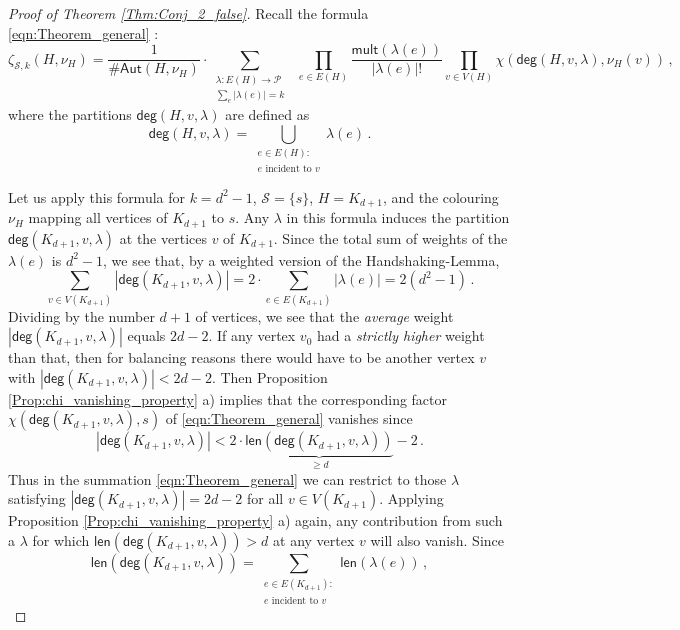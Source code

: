 \documentclass[authorcolumns,numberwithinsect]{no-lipics-v2022}
\begin{document}
\begin{proof}[Proof of Theorem \ref{Thm:Conj_2_false}]
Recall the formula \eqref{eqn:Theorem_general} :
\begin{equation} \zeta_{\mathcal{S},k}(H,\nu_H)=\frac{1}{\#\mathsf{Aut}(H, \nu_H)} \cdot \sum_{\substack{\lambda: E(H) \to \mathcal{P}\\\sum_e |\lambda(e)| = k }}\ \  \prod_{e \in E(H)} \frac{\mathsf{mult}(\lambda(e))}{|\lambda(e)|!}  \prod_{v \in V(H)} \chi(\mathsf{deg}(H, v, \lambda), \nu_H(v))\,,
\end{equation}
where the partitions $\mathsf{deg}(H, v, \lambda)$ are defined as
\[
\mathsf{deg}(H, v, \lambda) = \bigcup_{\substack{e \in E(H):\\ e \text{ incident to }v}} \lambda(e)\,. 
\]    

Let us apply this formula for $k=d^2-1$, $\mathcal{S}=\{s\}$, $H=K_{d+1}$, and the colouring $\nu_H$ mapping all vertices of $K_{d+1}$ to $s$. Any $\lambda$ in this formula induces the partition $\mathsf{deg}(K_{d+1}, v, \lambda)$ at the vertices $v$ of $K_{d+1}$. Since the total sum of weights of the $\lambda(e)$ is $d^2-1$, we see that, by a weighted version of the Handshaking-Lemma,
\begin{equation}
\sum_{v \in V(K_{d+1})} |\mathsf{deg}(K_{d+1}, v, \lambda)| = 2 \cdot \sum_{e \in E(K_{d+1})} |\lambda(e)| = 2(d^2-1)\,.
\end{equation}
Dividing by the number $d+1$ of vertices, we see that the \emph{average} weight $|\mathsf{deg}(K_{d+1}, v, \lambda)|$ equals $2d-2$. If any vertex $v_0$ had a \emph{strictly higher} weight than that, then for balancing reasons there would have to be another vertex $v$ with $|\mathsf{deg}(K_{d+1}, v, \lambda)|<2d-2$. Then Proposition \ref{Prop:chi_vanishing_property} a) implies that the corresponding factor $\chi(\mathsf{deg}(K_{d+1}, v, \lambda),s)$ of  \eqref{eqn:Theorem_general} vanishes since
\[
|\mathsf{deg}(K_{d+1}, v, \lambda)| < 2 \cdot \underbrace{\mathsf{len}(\mathsf{deg}(K_{d+1}, v, \lambda))}_{\geq d} - 2\,.
\]
Thus in the summation \eqref{eqn:Theorem_general} we can restrict to those $\lambda$ satisfying $|\mathsf{deg}(K_{d+1}, v, \lambda)|=2d-2$ for all $v \in V(K_{d+1})$. Applying Proposition \ref{Prop:chi_vanishing_property} a) again, any contribution from such a $\lambda$ for which $\mathsf{len}(\mathsf{deg}(K_{d+1}, v, \lambda))>d$ at any vertex $v$ will also vanish. Since
\[
\mathsf{len}(\mathsf{deg}(K_{d+1}, v, \lambda)) = \sum_{\substack{e \in E(K_{d+1}):\\ e \text{ incident to }v}} \mathsf{len}(\lambda(e))\,,
\]
\end{proof}
\end{document}
